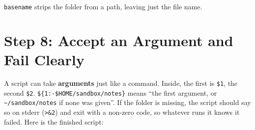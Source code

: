 \texttt{basename} strips the folder from a path, leaving just the file name.

\section{Step 8: Accept an Argument and Fail Clearly}\label{09-lab-automate-a-daily-chore:step-8-accept-an-argument-and-fail-clearly}

A script can take \textbf{arguments} just like a command. Inside, the first is \texttt{\$1}, the second \texttt{\$2}. \texttt{\$\{1:}\allowbreak{}\texttt{-}\allowbreak{}\texttt{\$HOME/}\allowbreak{}\texttt{sandbox/}\allowbreak{}\texttt{notes\}} means ``the first argument, or \texttt{\textasciitilde{}/sandbox/notes} if none was given''. If the folder is missing, the script should say so on stderr (\texttt{\textgreater{}\&2}) and exit with a non-zero code, so whatever runs it knows it failed. Here is the finished script:

